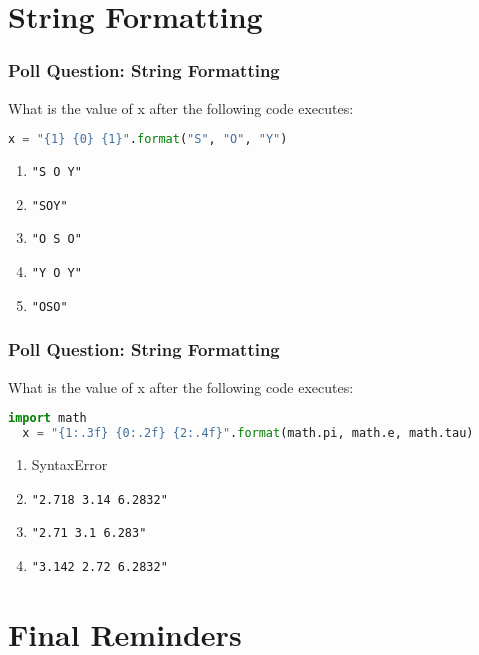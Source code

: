 \documentclass{beamer}
\begin{document}
\section{String Formatting}

\begin{frame}[fragile]
  \frametitle{Poll Question: String Formatting}
  What is the value of x after the following code executes:
  \begin{lstlisting}[language=Python, autogobble] 
  x = "{1} {0} {1}".format("S", "O", "Y")
  \end{lstlisting}
  \vfill
  \begin{enumerate}[A] 
    \item \lstinline|"S O Y"|
    \item \lstinline|"SOY"|
    \item \lstinline|"O S O"| %
    \item \lstinline|"Y O Y"|
    \item \lstinline|"OSO"|
  \end{enumerate}
\end{frame}

\begin{frame}[fragile]
  \frametitle{Poll Question: String Formatting}
  What is the value of x after the following code executes:
  \begin{lstlisting}[language=Python, autogobble] 
  import math
  x = "{1:.3f} {0:.2f} {2:.4f}".format(math.pi, math.e, math.tau)
  \end{lstlisting}
  \vfill
  \begin{enumerate}[A] 
    \item SyntaxError
    \item \lstinline|"2.718 3.14 6.2832"|
    \item \lstinline|"2.71 3.1 6.283"| 
    \item \lstinline|"3.142 2.72 6.2832"|
  \end{enumerate}
\end{frame}

\section{Final Reminders}

\end{document}
